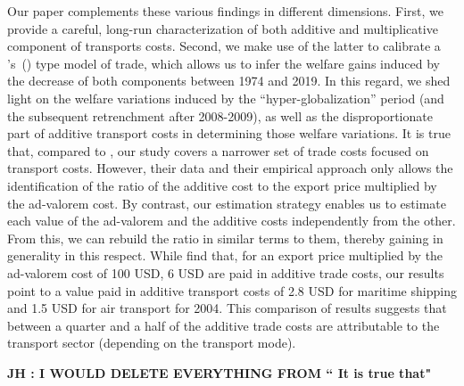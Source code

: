 \documentclass[a4paper,11pt]{article}
\newcommand\cites[1]{\citeauthor{#1}'s\ (\citeyear{#1})}
\begin{document}
Our paper complements these various findings in different dimensions. First, we provide a careful, long-run characterization of both additive and multiplicative component of transports costs. Second, we make use of the latter to calibrate a \cites{melitz} type model of trade, which allows us to infer the welfare gains induced by the decrease of both components between 1974 and 2019. In this regard, we shed light on the welfare variations induced by the ``hyper-globalization'' period (and the subsequent retrenchment after 2008-2009), as well as the disproportionate part of additive transport costs in determining those welfare variations. It is true that, compared to \cite{Irrazabal_2015}, our study covers a narrower set of trade costs focused on transport costs. However, their data and their empirical approach only allows the identification of the ratio of the additive cost to the export price multiplied by the ad-valorem cost. By contrast, our estimation strategy enables us to estimate each value of the ad-valorem and the additive costs independently from the other. From this, we can rebuild the ratio in similar terms to them, thereby gaining in generality in this respect. While \cite{Irrazabal_2015} find that, for an export price multiplied by the ad-valorem cost of 100 USD, 6 USD are paid in additive trade costs, our results point to a value paid in additive transport costs of 2.8 USD for maritime shipping and 1.5 USD for air transport for 2004. This comparison of results suggests that between a quarter and a half of the additive trade costs are attributable to the transport sector (depending on the transport mode).

\textbf{JH : I WOULD DELETE EVERYTHING FROM `` It is true that"}

\smallskip

\end{document}
